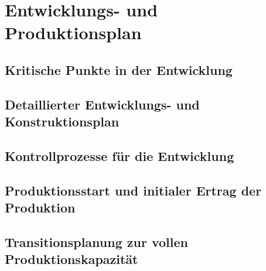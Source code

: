 \chapter{Entwicklungs- und Produktionsplan}

\section{Kritische Punkte in der Entwicklung}

\section{Detaillierter Entwicklungs- und Konstruktionsplan}

\section{Kontrollprozesse für die Entwicklung}

\section{Produktionsstart und initialer Ertrag der Produktion}

\section{Transitionsplanung zur vollen Produktionskapazität}
